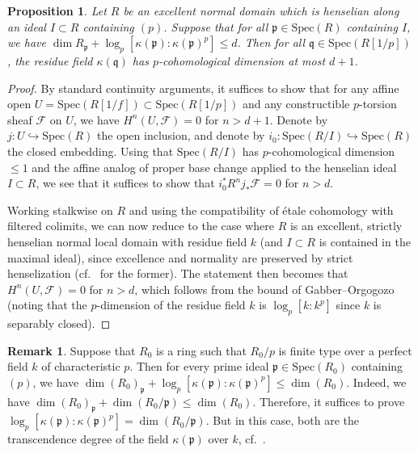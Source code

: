 \documentclass{amsart}
\newtheorem{proposition}[theorem]{Proposition}
\theoremstyle{definition}
\newcommand{\spec}{\mathrm{Spec}}
\newtheorem{remark}[theorem]{Remark}
\begin{document}
\begin{proposition} 
\label{pcohdimbound}
Let $R$ be an excellent normal domain which is henselian along an
ideal $I \subset R$ containing $(p)$. 
Suppose that for all $\mathfrak{p} \in \spec(R)$ containing $I$, we have $\dim R_{\mathfrak{p}}  +
\log_p [\kappa(\mathfrak{p}): \kappa(\mathfrak{p})^p] \leq d$. 
Then 
for all $\mathfrak{q} \in \spec(R[1/p])$, the residue field
$\kappa(\mathfrak{q})$ has $p$-cohomological dimension at most $  d + 1$. 
\end{proposition} 
\begin{proof} 
By standard continuity arguments, it suffices to show that for any affine open $U = \spec( R[1/f]) \subset
\spec(R[1/p])$ and any constructible $p$-torsion sheaf $\mathcal{F}$ on $U$,  we
have
$H^n( U, \mathcal{F}) = 0$ for $n >  d +1$. 
Denote by $j\colon  U \hookrightarrow \spec(R)$ the open inclusion, and denote by $i_0\colon 
\spec(R/I) \hookrightarrow \spec(R)$ the closed embedding. 
Using that $\spec(R/I)$ has $p$-cohomological dimension $\leq 1$ and the  affine
analog of proper base change \cite{Ga94, Hu93} applied to the henselian ideal
$I \subset R$, we see that it suffices
to show that $i_0^* R^n j_* \mathcal{F} = 0$ for $n >   d$. 

Working stalkwise on $R$ and using the compatibility of \'etale cohomology with
filtered colimits, we can now reduce to the case where $R$ is an excellent,  strictly
henselian normal local domain with residue field $k$ (and $I \subset R$ is
contained in the maximal ideal), since excellence and normality are preserved by
strict henselization (cf.~\cite{Gre76} for the former). 
The statement then becomes that $H^n( U, \mathcal{F}) = 0$ for $n >  
d$, which follows from the bound of Gabber--Orgogozo \cite[Th.~6.1]{GO08} (noting that the $p$-dimension of
the residue field $k$ is $\log_p [k:k^p]$ since $k$ is separably closed). 
\end{proof} 


\begin{remark} 
\label{dimremark}
Suppose that 
$R_0$ is a ring such that $R_0/p$ is finite type over a perfect field $k$ of characteristic
$p$. Then for every prime ideal $\mathfrak{p} \in \spec(R_0)$ containing $(p)$, we have
$\dim (R_0)_{\mathfrak{p}} + \log_p [\kappa(\mathfrak{p}): \kappa(\mathfrak{p})^p]
\leq \dim(R_0)$.  
Indeed, we have 
$\dim (R_0)_{\mathfrak{p}} + \dim (R_0/\mathfrak{p}) \leq \dim(R_0)$. 
Therefore, it suffices to prove 
$\log_p [ \kappa( \mathfrak{p}): \kappa(\mathfrak{p})^p] =
\dim(R_0/\mathfrak{p})$. 
But in this case, both are the transcendence degree of the field $\kappa(
\mathfrak{p}) $ over $k$, cf.~\cite[Th.~27.B]{Mat80}. \end{remark} 
\end{document}
